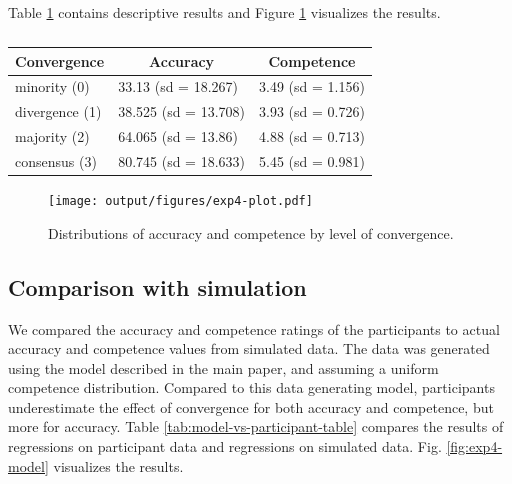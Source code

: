 \documentclass[
  doc,floatsintext]{apa6}
\begin{document}
Table \ref{tab:exp4-table} contains descriptive results and Figure \ref{fig:exp4-plot} visualizes the results.

\begin{table}[tbp]

\begin{center}
\begin{threeparttable}

\caption{\label{tab:exp4-table}}

\begin{tabular}{lll}
\toprule
Convergence & \multicolumn{1}{c}{Accuracy} & \multicolumn{1}{c}{Competence}\\
\midrule
minority (0) & 33.13 (sd = 18.267) & 3.49 (sd = 1.156)\\
divergence (1) & 38.525 (sd = 13.708) & 3.93 (sd = 0.726)\\
majority (2) & 64.065 (sd = 13.86) & 4.88 (sd = 0.713)\\
consensus (3) & 80.745 (sd = 18.633) & 5.45 (sd = 0.981)\\
\bottomrule
\end{tabular}

\end{threeparttable}
\end{center}

\end{table}



\begin{figure}
\centering
\texttt{[image: output/figures/exp4-plot.pdf]}
\caption{\label{fig:exp4-plot}Distributions of accuracy and competence by level of convergence.}
\end{figure}

\subsection{Comparison with simulation}\label{comparison-with-simulation}

We compared the accuracy and competence ratings of the participants to actual accuracy and competence values from simulated data. The data was generated using the model described in the main paper, and assuming a uniform competence distribution. Compared to this data generating model, participants underestimate the effect of convergence for both accuracy and competence, but more for accuracy. Table \ref{tab:model-vs-participant-table} compares the results of regressions on participant data and regressions on simulated data. Fig. \ref{fig:exp4-model} visualizes the results.
\end{document}
